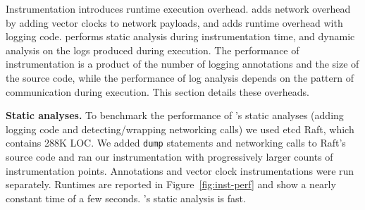 Instrumentation introduces runtime execution overhead. \dinv adds
network overhead by adding vector clocks to network payloads, and adds
runtime overhead with logging code. \dinv performs static analysis
during instrumentation time, and dynamic analysis on the logs produced
during execution. The performance of instrumentation is a product of
the number of logging annotations and the size of the source code,
while the performance of log analysis depends on the pattern of
communication during execution. This section details these overheads.



\textbf{Static analyses.} To benchmark the performance of \dinv's
static analyses (adding logging code and detecting/wrapping networking
calls) we used etcd Raft, which contains 288K LOC. We added {\tt dump}
statements and networking calls to Raft's source code and ran our
instrumentation with progressively larger counts of instrumentation
points. Annotations and vector clock instrumentations were run
separately. Runtimes are reported in Figure~\ref{fig:inst-perf} and
show a nearly constant time of a few seconds. \dinv's static analysis
is fast.


%

